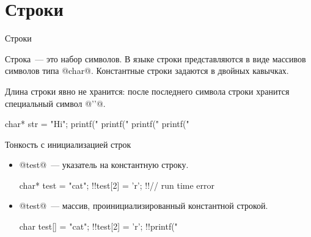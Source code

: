 \section{Строки}

\begin{frame}[fragile]{Строки}

  Строка~--- это набор символов. В языке  строки представляются в виде
  массивов символов типа @char@. Константные строки задаются в двойных
  кавычках.

  \pause
  Длина строки явно не хранится: после последнего символа строки хранится
  специальный символ @'\0'@.

  \pause
  \begin{clisting}
    char* str = "Hi";
    printf("%
    printf("%
    printf("%
    printf("%
  \end{clisting}


\end{frame}

\begin{frame}[fragile]{Тонкость с инициализацией строк}

  \begin{itemize}
    \item
      @test@~--- указатель на константную строку.
      \begin{clisting}[escapechar=!]
        char* test = "cat";
        !!test[2] = 'r'; !!// run time error
      \end{clisting}

    \item
      @test@~--- массив, проинициализированный константной строкой.
      \begin{clisting}[escapechar=!]
        char test[] = "cat";
        !!test[2] = 'r';
        !!printf("%
      \end{clisting}

  \end{itemize}

\end{frame}







